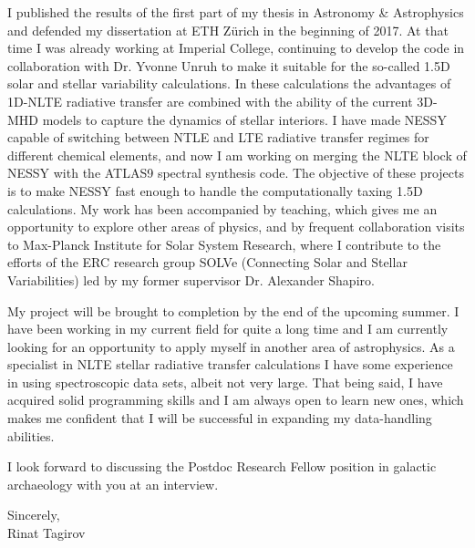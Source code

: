 \documentclass[11pt, a4paper]{awesome-cv}
\begin{document}
\begin{cvletter}
I published the results of the first part of my thesis in Astronomy \& Astrophysics 
and defended my dissertation at ETH Z{\"u}rich in the beginning of 2017.
At that time I was already working at Imperial College, continuing to develop
the code in collaboration with Dr. Yvonne Unruh to make it suitable
for the so-called 1.5D solar and stellar variability calculations. 
In these calculations the advantages of 1D-NLTE radiative transfer are
combined with the ability of the current 3D-MHD models to capture the dynamics of stellar interiors.
I have made NESSY capable of switching between NTLE and LTE radiative transfer regimes for different chemical elements,
and now I am working on merging the NLTE block of NESSY with the ATLAS9 spectral synthesis code.
The objective of these projects is to make NESSY fast enough to handle the computationally taxing 1.5D calculations.
My work has been accompanied by teaching, which gives me an opportunity to explore other areas of physics,
and by frequent collaboration visits to Max-Planck Institute for Solar System Research,
where I contribute to the efforts of the ERC research group SOLVe (Connecting Solar and Stellar Variabilities)
led by my former supervisor Dr. Alexander Shapiro.

My project will be brought to completion by the end of the upcoming summer.
I have been working in my current field for quite a long time and I am currently looking 
for an opportunity to apply myself in another area of astrophysics.
As a specialist in NLTE stellar radiative transfer calculations I have some experience in using spectroscopic data sets, albeit not very large.
That being said, I have acquired solid programming skills and I am always open to learn new ones, which makes me confident that
I will be successful in expanding my data-handling abilities.

I look forward to discussing the Postdoc Research Fellow position in galactic archaeology with you at an interview.

Sincerely,\\
Rinat Tagirov

\end{cvletter}


\end{document}

